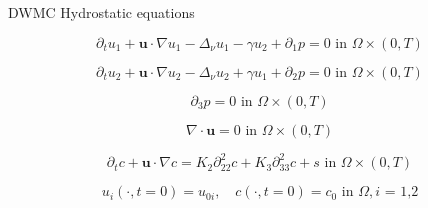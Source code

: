\documentclass{beamer}
\begin{document}
\begin{frame}{DWMC Hydrostatic equations}

\begin{equation} \nonumber   
  \partial_t u_1 + \mathbf{u} \cdot \nabla u_1 - \Delta_\nu u_1 -\gamma u_2 + \partial_1 p = 0 \text{ in } \Omega \times (0,T)
\end{equation}

\begin{equation} \nonumber   
  \partial_t u_2 + \mathbf{u} \cdot \nabla u_2 - \Delta_\nu u_2 + \gamma u_1 + \partial_2 p = 0 \text{ in } \Omega \times (0,T)
\end{equation}

\begin{equation} \nonumber   
  \partial_3 p = 0 \text{ in } \Omega \times (0,T)
\end{equation}

\begin{equation} \nonumber  
  \nabla \cdot \mathbf{u} = 0 \text{ in } \Omega \times (0,T)
\end{equation}

\begin{equation} \nonumber  
  \partial_t c + \mathbf{u} \cdot \nabla c = K_2 \partial_{22} ^ 2 c + K_3 \partial_{33} ^2 c + s \text{ in } \Omega \times (0,T)
\end{equation}

\begin{equation} \nonumber
  u_i (\cdot, t=0) = u_{0 i}, \quad c (\cdot, t=0) = c_0 \text{ in } \Omega, \text{$i$ = 1,2}
\end{equation}

\end{frame}
\end{document}
